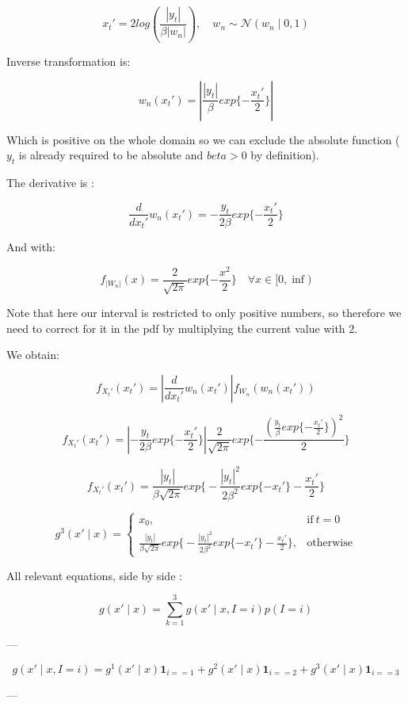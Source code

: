 \documentclass[]{article}
\begin{document}
	$$ x_t' =  2 log(\frac{|y_t|}{\beta |w_n|})  , \quad w_n \sim \mathcal{N}(w_n \mid 0,1) $$
	
	Inverse transformation is:
	
	$$ w_n(x_t') = \left| \frac{|y_t|}{\beta} exp \{ - \frac{x_t'}{2}\} \right | $$
	
	Which is positive on the whole domain so we can exclude the absolute function ( $y_t$ is already required to be absolute and $beta>0$ by definition).
	
	
	The derivative is :
	
	$$ \frac{d}{d x_t'} w_n(x_t') = -\frac{y_t}{2\beta} exp \{ - \frac{x_t'}{2}\} $$
	
	And with:
	
	$$  f_{|W_n|}( x ) = \frac{2}{\sqrt{2 \pi}}  exp\{ -\frac{x^2}{2} \} \quad \forall x \in [0,\inf)$$
	
	Note that here our interval is restricted to only positive numbers, so therefore we need to correct for it in the pdf by multiplying the current value with $2$.
	
	We obtain:
	
	$$ f_{X_t'}(x_t') = \left | \frac{d}{dx_t'} w_n(x_t') \right | f_{W_n}(w_n(x_t')) $$
	
	$$ f_{X_t'}(x_t') = \left | -\frac{y_t}{2\beta} exp \{ - \frac{x_t'}{2}\} \right | \frac{2}{\sqrt{2 \pi}}  exp\{ -\frac{(\frac{y_t}{\beta} exp \{ - \frac{x_t'}{2}\})^2}{2} \} $$
	
	$$ f_{X_t'}(x_t') = \frac{|y_t|}{\beta \sqrt{2 \pi}} exp \bigg\{ -\frac{|y_t|^2}{2 \beta^2} exp\{-x_t' \} - \frac{x_t'}{2} \bigg\} $$
	
	
	\begin{equation}
	g^3(x' \mid x)=
	\begin{cases}
	x_0, & \text{if}\ t=0 \\
	\frac{|y_t|}{\beta \sqrt{2 \pi}} exp \bigg\{ -\frac{|y_t|^2}{2 \beta^2} exp\{-x_t' \} - \frac{x_t'}{2} \bigg\}, & \text{otherwise}
	\end{cases}
	\end{equation}
	
	All relevant equations, side by side :
	
	$$ g(x' \mid x) = \sum_{k=1}^3 g(x' \mid x, I=i) p(I=i) $$
	
	---
	
	$$ g(x' \mid x, I=i) = g^1(x' \mid x)  \mathbf{1}_{i==1} + g^2(x' \mid x)  \mathbf{1}_{i==2} + g^3(x' \mid x)  \mathbf{1}_{i==3}  $$
	
	---
	
\end{document}
